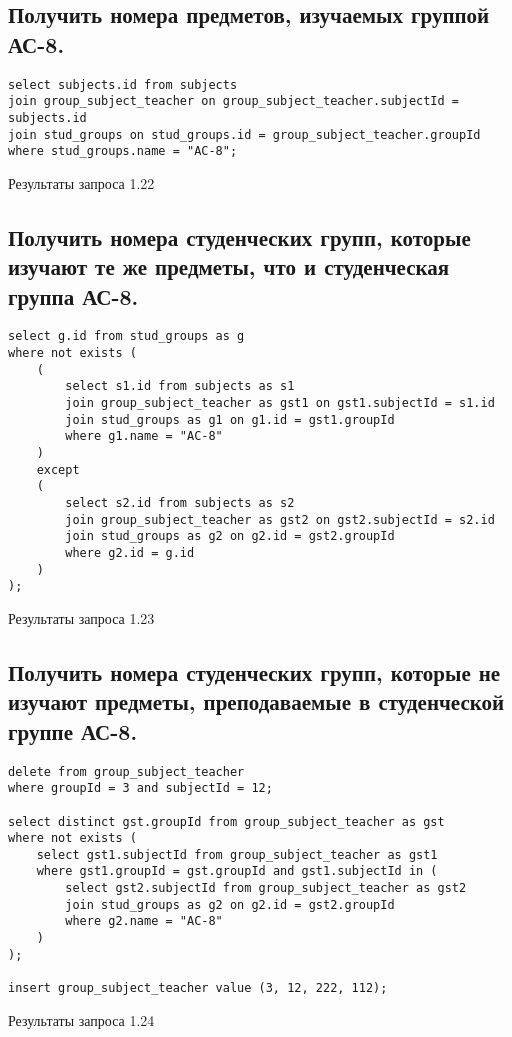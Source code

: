 \documentclass[a4paper,8pt]{article}
\begin{document}
\subsection{Получить номера предметов, изучаемых группой АС-8.}
\begin{verbatim}
select subjects.id from subjects
join group_subject_teacher on group_subject_teacher.subjectId = subjects.id
join stud_groups on stud_groups.id = group_subject_teacher.groupId
where stud_groups.name = "АС-8";
\end{verbatim}
\begin{table}[H]
\centering

\caption{Результаты запроса 1.22}
\end{table}

\subsection{Получить номера студенческих групп, которые изучают те же предметы, что и студенческая группа АС-8.}
\begin{verbatim}
select g.id from stud_groups as g
where not exists (
	(
		select s1.id from subjects as s1
		join group_subject_teacher as gst1 on gst1.subjectId = s1.id
		join stud_groups as g1 on g1.id = gst1.groupId
		where g1.name = "АС-8"
    )
    except 
    (
		select s2.id from subjects as s2
		join group_subject_teacher as gst2 on gst2.subjectId = s2.id
		join stud_groups as g2 on g2.id = gst2.groupId
		where g2.id = g.id
    )
);
\end{verbatim}
\begin{table}[H]
\centering

\caption{Результаты запроса 1.23}
\end{table}

\subsection{Получить номера студенческих групп, которые не изучают предметы, преподаваемые в студенческой группе АС-8.}
\begin{verbatim}
delete from group_subject_teacher 
where groupId = 3 and subjectId = 12;

select distinct gst.groupId from group_subject_teacher as gst
where not exists (
	select gst1.subjectId from group_subject_teacher as gst1
    where gst1.groupId = gst.groupId and gst1.subjectId in (
		select gst2.subjectId from group_subject_teacher as gst2
        join stud_groups as g2 on g2.id = gst2.groupId
        where g2.name = "АС-8"
    )
);

insert group_subject_teacher value (3, 12, 222, 112);
\end{verbatim}
\begin{table}[H]
\centering

\caption{Результаты запроса 1.24}
\end{table}
\end{document}
